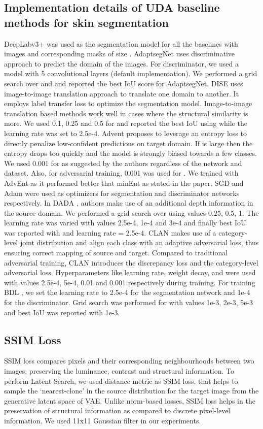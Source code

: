 \documentclass[runningheads]{llncs}
\begin{document}
\subsection{Implementation details of UDA baseline methods for skin segmentation}
DeepLabv3+ was used as the segmentation model for all the baselines with images and corresponding masks of size . AdaptsegNet \cite{tsai2018learning} uses discriminative approach to predict the domain of the images.
For discriminator, we used a model with 5 convolutional layers (default implementation). We performed a grid search over   and  and reported the best IoU score for AdaptsegNet.
DISE \cite{chang2019all} uses image-to-image translation approach to translate one domain to another. It employs label transfer loss to optimize the segmentation model. Image-to-image translation based methods work well in cases where the structural similarity is more. 
We used 0.1, 0.25 and 0.5 for  and reported the best IoU using  while the learning rate was set to 2.5e-4.
Advent \cite{vu2018advent} proposes to leverage an entropy loss to directly penalize low-confident predictions on target domain. If  is large then the entropy drops too quickly and the model is strongly biased towards a few classes. We used 0.001 for  as suggested by the authors regardless of the network and dataset. Also, for adversarial training, 0.001 was used for . We trained with AdvEnt as it performed better that minEnt as stated in the paper. SGD and Adam were used as optimizers for segmentation and discriminator networks respectively.
In DADA \cite{vu2019dada}, authors make use of an additional depth information in the source domain. We performed a grid search over  using values 0.25, 0.5, 1. The learning rate was varied with values 2.5e-4, 1e-4 and 3e-4 and finally best IoU was reported with  and learning rate = 2.5e-4. 
CLAN \cite{luo2019taking} makes use of a category-level joint distribution and align each class with an adaptive adversarial loss, thus ensuring correct mapping of source and target. Compared to traditional adversarial training, CLAN introduces the discrepancy loss and the category-level adversarial loss. Hyperparameters like learning rate, weight decay,  and  were used with values 2.5e-4, 5e-4, 0.01 and 0.001 respectively during training. 
For training BDL \cite{li2019bidirectional}, we set the learning rate to 2.5e-4 for the segmentation network and 1e-4 for the discriminator. Grid search was performed for  with values 1e-3, 2e-3, 5e-3 and best IoU was reported with  1e-3.


\subsection{SSIM Loss}
SSIM loss compares pixels and their corresponding neighbourhoods between two images, preserving the luminance, contrast and structural information. To perform Latent Search, we used distance metric as SSIM loss, that helps to sample the ‘nearest-clone’ in the source distribution for the target image from the generative latent space of VAE. Unlike norm-based losses, SSIM loss helps in the preservation of structural information as compared to discrete pixel-level information. We used 11x11 Gaussian filter in our experiments.
\end{document}
